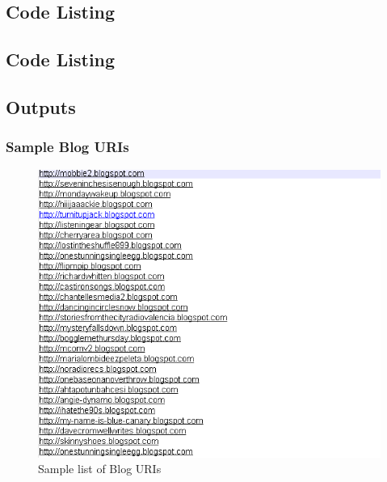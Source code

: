 \subsection{Code Listing}


\newpage

\subsection{Code Listing}


\newpage

\subsection{Outputs}

\subsubsection{Sample Blog URIs}
\begin{figure}[ht]    
    \begin{center}
        \includegraphics[scale=0.9]{sampleblogurls.png}
        \caption{Sample list of Blog URIs}
        \label{Samplelist1}
    \end{center}
\end{figure}
\newpage
